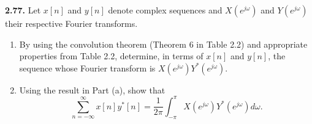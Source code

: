 \LTR

\textbf{2.77.} Let $x[n]$ and $y[n]$ denote complex sequences and $X(e^{j\omega})$ and $Y(e^{j\omega})$ their respective Fourier transforms.
\begin{enumerate}
    \item[\textbf{(a)}] By using the convolution theorem (Theorem 6 in Table 2.2) and appropriate properties from Table 2.2, determine, in terms of $x[n]$ and $y[n]$, the sequence whose Fourier transform is $X(e^{j\omega})Y^*(e^{j\omega})$.
    \item[\textbf{(b)}] Using the result in Part (a), show that
    \begin{equation}\tag{P2.77-1}
        \sum_{n=-\infty}^{\infty} x[n]y^*[n] = \frac{1}{2\pi} \int_{-\pi}^{\pi} X(e^{j\omega})Y^*(e^{j\omega})d\omega.
    \end{equation}
\end{enumerate}

\RTL
